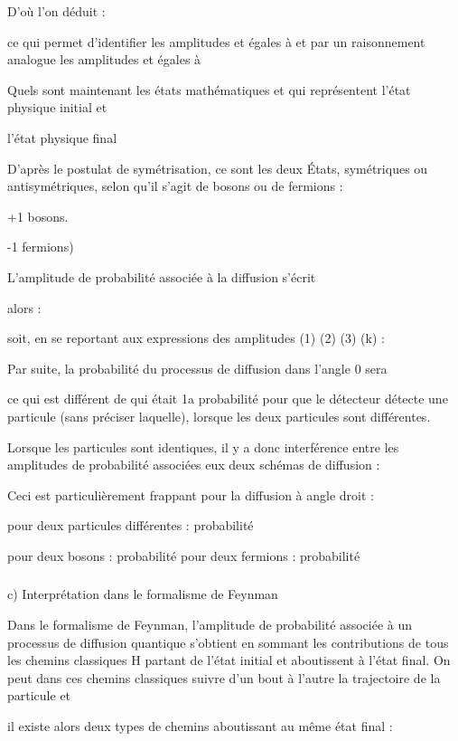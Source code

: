 D'où l'on déduit :

ce qui permet d'identifier les amplitudes  et  égales à
 et par un raisonnement analogue les amplitudes  et 
égales à 

Quels sont maintenant les états mathématiques 
et qui représentent l'état physique initial  et

l'état physique final 

D'après le postulat de symétrisation, ce sont les deux
États, symétriques ou antisymétriques, selon qu'il s'agit de bosons
ou de fermions :

+1 bosons.

-1 fermions)


L'amplitude de probabilité associée à la diffusion s'écrit

alors :

soit, en se reportant aux expressions des amplitudes (1) (2) (3) (k) :

Par suite, la probabilité du processus de diffusion dans l'angle 0 sera

ce qui est différent de  qui était 1a probabilité pour que le détecteur détecte
une particule (sans préciser laquelle),
lorsque les deux particules sont différentes.

Lorsque les particules sont identiques, il y a donc interférence entre les
amplitudes de probabilité associées eux deux schémas
de diffusion :


Ceci est particulièrement frappant pour la diffusion à angle
droit  :

pour deux particules différentes : probabilité

pour deux bosons : probabilité
pour deux fermions : probabilité

\subsubsection{}%
c) Interprétation dans le formalisme de Feynman

Dans le formalisme de Feynman, l'amplitude de probabilité
associée à un processus de diffusion quantique s'obtient en sommant
les contributions de tous les chemins classiques H partant de l'état
initial et aboutissent à l'état final. On peut dans ces chemins classiques
suivre d'un bout à l'autre la trajectoire de la particule et

il existe alors deux types de chemins aboutissant au même état final :

